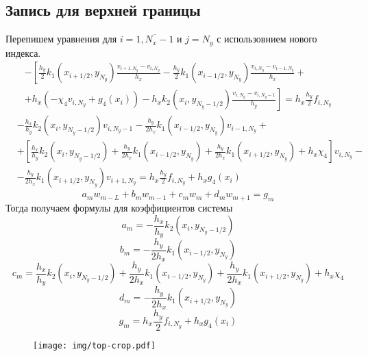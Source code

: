 \subsection{Запись для верхней границы}
Перепишем уравнения для $i = \overline{1,N_x-1}$ и $j = N_y$ с использовнием нового индекса.
\begin{multline*}
    - \left[
    \frac{h_y}{2} k_1(x_{i+1/2},y_{N_y}) \frac{v_{i+1,N_y} - v_{i,N_y}}{h_x} - \frac{h_y}{2} k_1(x_{i-1/2},y_{N_y}) \frac{v_{i,N_y} - v_{i-1,N_y}}{h_x} + \right. \\
    \left. +
    h_x \left( - \chi_4 v_{i,N_y} + g_4(x_i) \right) - h_x k_2(x_i,y_{N_y-1/2}) \frac{v_{i,N_y} - v_{i,N_y-1}}{h_y}
    \right] =
    h_x \frac{h_y}{2} f_{i,N_y}
\end{multline*}
\[
\begin{split}
    &-\frac{h_x}{h_y} k_2(x_i,y_{N_y-1/2}) v_{i,N_y-1} - \frac{h_y}{2 h_x} k_1(x_{i-1/2},y_{N_y}) v_{i-1,N_y} +\\
    &+\left[ \frac{h_x}{h_y} k_2(x_i,y_{N_y-1/2}) + \frac{h_y}{2 h_x} k_1(x_{i-1/2},y_{N_y}) + \frac{h_y}{2 h_x} k_1(x_{i+1/2},y_{N_y}) + h_x \chi_4 \right] v_{i,N_y} - \\
    &-\frac{h_y}{2 h_x} k_1(x_{i+1/2},y_{N_y}) v_{i+1,N_y} = h_x \frac{h_y}{2} f_{i,N_y} + h_x g_4(x_i)
\end{split}
\]
\[ a_m w_{m - L} + b_m w_{m - 1} + c_m w_m + d_m w_{m + 1} = g_m \]
Тогда получаем формулы для коэффициентов системы
\[ a_m = -\frac{h_x}{h_y} k_2(x_i,y_{N_y-1/2}) \]
\[ b_m = -\frac{h_y}{2 h_x} k_1(x_{i-1/2},y_{N_y}) \]
\[ c_m = \frac{h_x}{h_y} k_2(x_i,y_{N_y-1/2}) + \frac{h_y}{2 h_x} k_1(x_{i-1/2},y_{N_y}) + \frac{h_y}{2 h_x} k_1(x_{i+1/2},y_{N_y}) + h_x \chi_4 \]
\[ d_m = -\frac{h_y}{2 h_x} k_1(x_{i+1/2},y_{N_y}) \]
\[ g_m = h_x \frac{h_y}{2} f_{i,N_y} + h_x g_4(x_i) \]
\begin{figure}[H]
    \centering
    \texttt{[image: img/top-crop.pdf]}
\end{figure}

